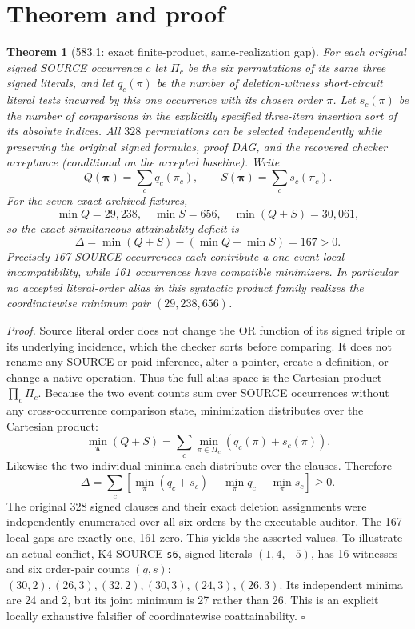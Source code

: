 \documentclass[11pt]{article}
\newtheorem{theorem}{Theorem}
\begin{document}
\section*{Theorem and proof}
\begin{theorem}[583.1: exact finite-product, same-realization gap]
For each original signed SOURCE occurrence \(c\) let \(\Pi_c\) be the six permutations of its same three signed literals, and let \(q_c(\pi)\) be the number of deletion-witness short-circuit literal tests incurred by this one occurrence with its chosen order \(\pi\). Let \(s_c(\pi)\) be the number of comparisons in the explicitly specified three-item insertion sort of its absolute indices. All \(328\) permutations can be selected independently while preserving the original signed formulas, proof DAG, and the recovered checker acceptance (conditional on the accepted baseline). Write
\[
Q(\boldsymbol\pi)=\sum_c q_c(\pi_c),\qquad S(\boldsymbol\pi)=\sum_c s_c(\pi_c).
\]
For the seven exact archived fixtures,
\[
\min Q=29{,}238,\quad \min S=656,\quad
\min(Q+S)=30{,}061,
\]
so the exact simultaneous-attainability deficit is
\[
\boxed{\Delta=\min(Q+S)-(\min Q+\min S)=167>0.}
\]
Precisely 167 SOURCE occurrences each contribute a one-event local incompatibility, while 161 occurrences have compatible minimizers. In particular no accepted literal-order alias in this syntactic product family realizes the coordinatewise minimum pair \((29{,}238,656)\).
\end{theorem}
\noindent\emph{Proof.} Source literal order does not change the OR function of its signed triple or its underlying incidence, which the checker sorts before comparing. It does not rename any SOURCE or paid inference, alter a pointer, create a definition, or change a native operation. Thus the full alias space is the Cartesian product \(\prod_c\Pi_c\). Because the two event counts sum over SOURCE occurrences without any cross-occurrence comparison state, minimization distributes over the Cartesian product:
\[
\min_{\boldsymbol\pi}(Q+S)=\sum_c\min_{\pi\in\Pi_c}(q_c(\pi)+s_c(\pi)).
\]
Likewise the two individual minima each distribute over the clauses. Therefore
\[
\Delta=\sum_c\left[\min_\pi(q_c+s_c)-\min_\pi q_c-\min_\pi s_c\right]\ge0.
\]
The original 328 signed clauses and their exact deletion assignments were independently enumerated over all six orders by the executable auditor. The 167 local gaps are exactly one, 161 zero. This yields the asserted values. To illustrate an actual conflict, K4 SOURCE \texttt{s6}, signed literals \((1,4,-5)\), has 16 witnesses and six order-pair counts \((q,s)\): \((30,2),(26,3),(32,2),(30,3),(24,3),(26,3)\). Its independent minima are 24 and 2, but its joint minimum is 27 rather than 26. This is an explicit locally exhaustive falsifier of coordinatewise coattainability. \(\square\)
\end{document}
